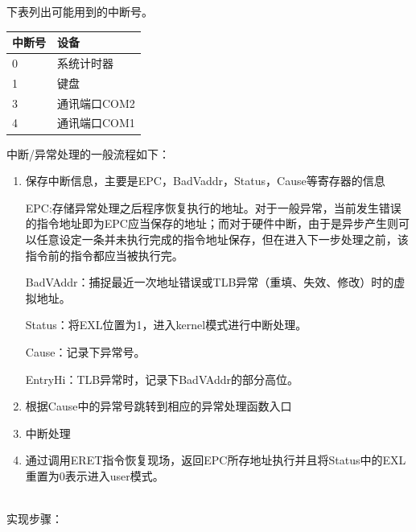 下表列出可能用到的中断号。

\begin{table}[H]
\centering
\begin{tabular}{ll}
\hline
中断号&设备\\
\hline
0&系统计时器\\
1&键盘\\
3&通讯端口COM2\\
4&通讯端口COM1\\
\hline
\end{tabular}
\end{table}

中断/异常处理的一般流程如下：

\begin{enumerate}[(1)]
\item 保存中断信息，主要是EPC，BadVaddr，Status，Cause等寄存器的信息

\qquad EPC:存储异常处理之后程序恢复执行的地址。对于一般异常，当前发生错误的指令地址即为EPC应当保存的地址；而对于硬件中断，由于是异步产生则可以任意设定一条并未执行完成的指令地址保存，但在进入下一步处理之前，该指令前的指令都应当被执行完。

\qquad BadVAddr：捕捉最近一次地址错误或TLB异常（重填、失效、修改）时的虚拟地址。

\qquad Status：将EXL位置为1，进入kernel模式进行中断处理。

\qquad Cause：记录下异常号。

\qquad EntryHi：TLB异常时，记录下BadVAddr的部分高位。

\item 根据Cause中的异常号跳转到相应的异常处理函数入口

\item 中断处理

\item 通过调用ERET指令恢复现场，返回EPC所存地址执行并且将Status中的EXL重置为0表示进入user模式。

\end{enumerate}

\quad \\
实现步骤：

